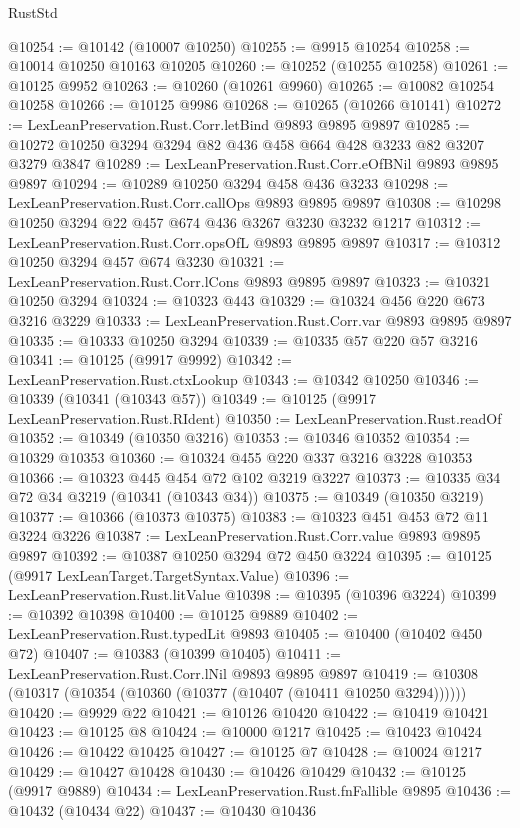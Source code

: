 \begin{lexlean}{RustStd}
\begin{coremodule}
{\begin{coremodule}
{{{{{{{{{{{{{{{{{{{{{{{{{@10254 := @10142 (@10007 @10250)
@10255 := @9915 @10254
@10258 := @10014 @10250 @10163 @10205
@10260 := @10252 (@10255 @10258)
@10261 := @10125 @9952
@10263 := @10260 (@10261 @9960)
@10265 := @10082 @10254 @10258
@10266 := @10125 @9986
@10268 := @10265 (@10266 @10141)
@10272 := LexLeanPreservation.Rust.Corr.letBind @9893 @9895 @9897
@10285 := @10272 @10250 @3294 @3294 @82 @436 @458 @664 @428 @3233 @82 @3207 @3279 @3847
@10289 := LexLeanPreservation.Rust.Corr.eOfBNil @9893 @9895 @9897
@10294 := @10289 @10250 @3294 @458 @436 @3233
@10298 := LexLeanPreservation.Rust.Corr.callOps @9893 @9895 @9897
@10308 := @10298 @10250 @3294 @22 @457 @674 @436 @3267 @3230 @3232 @1217
@10312 := LexLeanPreservation.Rust.Corr.opsOfL @9893 @9895 @9897
@10317 := @10312 @10250 @3294 @457 @674 @3230
@10321 := LexLeanPreservation.Rust.Corr.lCons @9893 @9895 @9897
@10323 := @10321 @10250 @3294
@10324 := @10323 @443
@10329 := @10324 @456 @220 @673 @3216 @3229
@10333 := LexLeanPreservation.Rust.Corr.var @9893 @9895 @9897
@10335 := @10333 @10250 @3294
@10339 := @10335 @57 @220 @57 @3216
@10341 := @10125 (@9917 @9992)
@10342 := LexLeanPreservation.Rust.ctxLookup
@10343 := @10342 @10250
@10346 := @10339 (@10341 (@10343 @57))
@10349 := @10125 (@9917 LexLeanPreservation.Rust.RIdent)
@10350 := LexLeanPreservation.Rust.readOf
@10352 := @10349 (@10350 @3216)
@10353 := @10346 @10352
@10354 := @10329 @10353
@10360 := @10324 @455 @220 @337 @3216 @3228 @10353
@10366 := @10323 @445 @454 @72 @102 @3219 @3227
@10373 := @10335 @34 @72 @34 @3219 (@10341 (@10343 @34))
@10375 := @10349 (@10350 @3219)
@10377 := @10366 (@10373 @10375)
@10383 := @10323 @451 @453 @72 @11 @3224 @3226
@10387 := LexLeanPreservation.Rust.Corr.value @9893 @9895 @9897
@10392 := @10387 @10250 @3294 @72 @450 @3224
@10395 := @10125 (@9917 LexLeanTarget.TargetSyntax.Value)
@10396 := LexLeanPreservation.Rust.litValue
@10398 := @10395 (@10396 @3224)
@10399 := @10392 @10398
@10400 := @10125 @9889
@10402 := LexLeanPreservation.Rust.typedLit @9893
@10405 := @10400 (@10402 @450 @72)
@10407 := @10383 (@10399 @10405)
@10411 := LexLeanPreservation.Rust.Corr.lNil @9893 @9895 @9897
@10419 := @10308 (@10317 (@10354 (@10360 (@10377 (@10407 (@10411 @10250 @3294))))))
@10420 := @9929 @22
@10421 := @10126 @10420
@10422 := @10419 @10421
@10423 := @10125 @8
@10424 := @10000 @1217
@10425 := @10423 @10424
@10426 := @10422 @10425
@10427 := @10125 @7
@10428 := @10024 @1217
@10429 := @10427 @10428
@10430 := @10426 @10429
@10432 := @10125 (@9917 @9889)
@10434 := LexLeanPreservation.Rust.fnFallible @9895
@10436 := @10432 (@10434 @22)
@10437 := @10430 @10436
}}}}}}}}}}}}}}}}}}}}}}}}}
\end{coremodule}}
\end{coremodule}
\end{lexlean}
